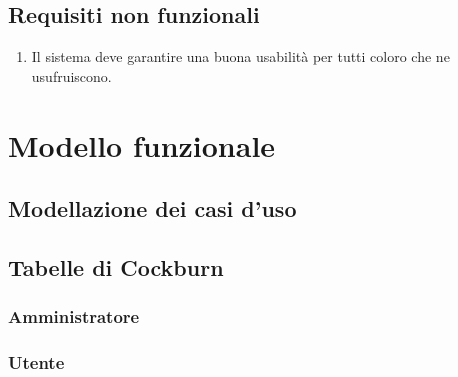 \section{Requisiti non funzionali}
\begin{enumerate}
    \item Il sistema deve garantire una buona usabilità per tutti coloro che ne usufruiscono.
\end{enumerate}
\chapter{Modello funzionale}

\section{Modellazione dei casi d'uso}



\section{Tabelle di Cockburn}
\subsection{Amministratore}


\pagebreak



\pagebreak

\subsection{Utente}







\pagebreak
